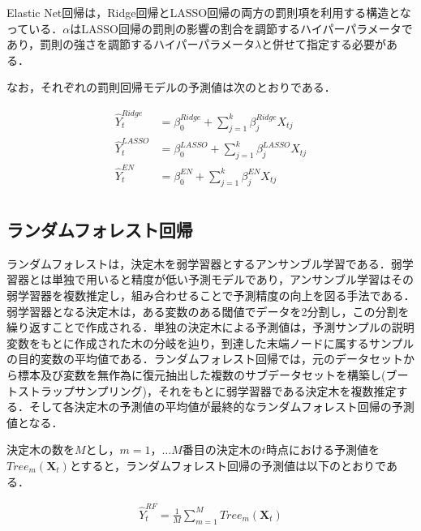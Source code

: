 \documentclass[a4paper，11pt]{jsarticle}
\begin{document}
Elastic Net回帰は，Ridge回帰とLASSO回帰の両方の罰則項を利用する構造となっている．$\alpha$はLASSO回帰の罰則の影響の割合を調節するハイパーパラメータであり，罰則の強さを調節するハイパーパラメータ$\lambda$と併せて指定する必要がある．

なお，それぞれの罰則回帰モデルの予測値は次のとおりである．

\begin{equation}
  \begin{split}
    \hat{Y}_t^{Ridge} &= \beta_0^{Ridge} + \sum_{j=1}^{k} \beta_{j}^{Ridge} X_{tj} \\
    \hat{Y}_t^{LASSO} &= \beta_0^{LASSO} + \sum_{j=1}^{k} \beta_{j}^{LASSO} X_{tj} \\
    \hat{Y}_t^{EN} &= \beta_0^{EN} + \sum_{j=1}^{k} \beta_{j}^{EN} X_{tj} \\
  \end{split}
\end{equation}

\subsection{ランダムフォレスト回帰}

ランダムフォレスト\citep{breiman2001random}は，決定木を弱学習器とするアンサンブル学習である．弱学習器とは単独で用いると精度が低い予測モデルであり，アンサンブル学習はその弱学習器を複数推定し，組み合わせることで予測精度の向上を図る手法である．弱学習器となる決定木は，ある変数のある閾値でデータを2分割し，この分割を繰り返すことで作成される．単独の決定木による予測値は，予測サンプルの説明変数をもとに作成された木の分岐を辿り，到達した末端ノードに属するサンプルの目的変数の平均値である．ランダムフォレスト回帰では，元のデータセットから標本及び変数を無作為に復元抽出した複数のサブデータセットを構築し(ブートストラップサンプリング)，それをもとに弱学習器である決定木を複数推定する．そして各決定木の予測値の平均値が最終的なランダムフォレスト回帰の予測値となる．


決定木の数を$M$とし，$m=1，\ldots M$番目の決定木の$t$時点における予測値を$\textit{Tree}_m(\bm{X}_t)$とすると，ランダムフォレスト回帰の予測値は以下のとおりである．

\begin{equation}
  \begin{split}
    \hat{Y}_t^{RF} = \frac{1}{M} \sum_{m=1}^{M} \textit{Tree}_m(\bm{X}_t)
  \end{split}
\end{equation}
\end{document}
